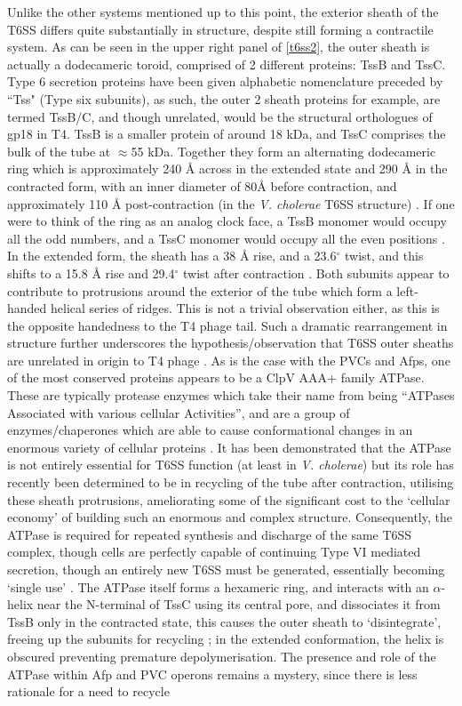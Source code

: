 Unlike the other systems mentioned up to this point, the exterior sheath of the T6SS differs quite substantially in structure, despite still forming a contractile system. As can be seen in the upper right panel of \vref{t6ss2}, the outer sheath is actually a dodecameric toroid, comprised of 2 different proteins: TssB and TssC. Type 6 secretion proteins have been given alphabetic nomenclature preceded by ``Tss" (Type six subunits), as such, the outer 2 sheath proteins for example, are termed TssB/C, and though unrelated, would be the structural orthologues of gp18 in T4. TssB is a smaller protein of around 18 kDa, and TssC comprises the bulk of the tube at $\approx$55 kDa. Together they form an alternating dodecameric ring which is approximately 240 \AA{} across in the extended state and 290 \AA{} in the contracted form, with an inner diameter of 80\AA{} before contraction, and approximately 110 \AA{} post-contraction (in the \emph{V. cholerae} T6SS structure) \citep{Cascales2012, Wang2017, Kube2014a}. If one were to think of the ring as an analog clock face, a TssB monomer would occupy all the odd numbers, and a TssC monomer would occupy all the even positions \citep{Kube2014a}. In the extended form, the sheath has a 38 \AA{} rise, and a 23.6$^{\circ}$ twist, and this shifts to a 15.8 \AA{} rise and 29.4$^{\circ}$ twist after contraction \citep{Wang2017}. Both subunits appear to contribute to protrusions around the exterior of the tube which form a left-handed helical series of ridges. This is not a trivial observation either, as this is the opposite handedness to the T4 phage tail. Such a dramatic rearrangement in structure further underscores the hypothesis/observation that T6SS outer sheaths are unrelated in origin to T4 phage \citep{Kube2014a}. As is the case with the PVCs and Afps, one of the most conserved proteins appears to be a ClpV AAA+ family ATPase. These are typically protease enzymes which take their name from being ``ATPases Associated with various cellular Activities'', and are a group of enzymes/chaperones which are able to cause conformational changes in an enormous variety of cellular proteins \citep{Hanson2005}. It has been demonstrated that the ATPase is not entirely essential for T6SS function (at least in \emph{V. cholerae}) but its role has recently been determined to be in recycling of the tube after contraction, utilising these sheath protrusions, ameliorating some of the significant cost to the `cellular economy' of building such an enormous and complex structure. Consequently, the ATPase is required for repeated synthesis and discharge of the same T6SS complex, though cells are perfectly capable of continuing Type VI mediated secretion, though an entirely new T6SS must be generated, essentially becoming `single use' \cite{Basler2015}. The ATPase itself forms a hexameric ring, and interacts with an $\alpha$-helix near the N-terminal of TssC using its central pore, and dissociates it from TssB only in the contracted state, this causes the outer sheath to `disintegrate', freeing up the subunits for recycling \citep{Costa2015}; in the extended conformation, the helix is obscured preventing premature depolymerisation. The presence and role of the ATPase within Afp and PVC operons remains a mystery, since there is less rationale for a need to recycle 